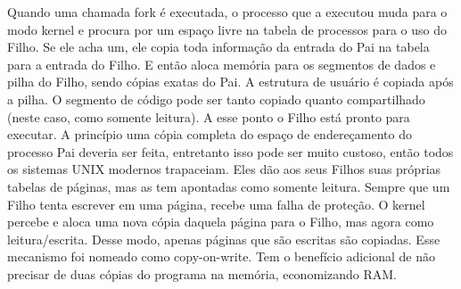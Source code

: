 Quando uma chamada fork é executada, o processo que a executou muda para o modo kernel e procura por um espaço livre na tabela de processos para o uso do Filho. Se ele acha um, ele copia toda informação da entrada do Pai na tabela para a entrada do Filho. E então aloca memória para os segmentos de dados e pilha do Filho, sendo cópias exatas do Pai. A estrutura de usuário é copiada após a pilha. O segmento de código pode ser tanto copiado quanto compartilhado (neste caso, como somente leitura). A esse ponto o Filho está pronto para executar.
A princípio uma cópia completa do espaço de endereçamento do processo Pai deveria ser feita, entretanto isso pode ser muito custoso, então todos os sistemas UNIX modernos trapaceiam. Eles dão aos seus Filhos suas próprias tabelas de páginas, mas as tem apontadas como somente leitura. Sempre que um Filho tenta escrever em uma página, recebe uma falha de proteção. O kernel percebe e aloca uma nova cópia daquela página para o Filho, mas agora como leitura/escrita. Desse modo, apenas páginas que são escritas são copiadas. Esse mecanismo foi nomeado como copy-on-write. Tem o benefício adicional de não precisar de duas cópias do programa na memória, economizando RAM.

